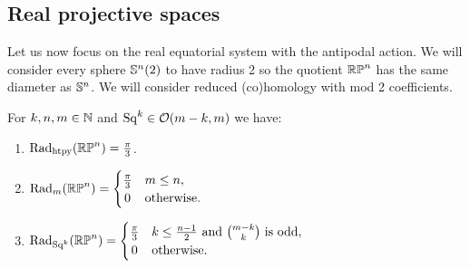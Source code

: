 
\subsection{Real projective spaces}\label{s:critical_radii_rpn}

Let us now focus on the real equatorial system with the antipodal action.
We will consider every sphere \(\mathbb{S}^n(2)\) to have radius 2 so the quotient \(\mathbb{RP}^n\) has the same diameter as \(\mathbb{S}^n\).
We will consider reduced (co)homology with mod 2 coefficients.

\medskip\lemma
For \(k,n,m \in \mathbb{N}\) and \(\mathrm{Sq}^k \in \mathcal{O}(m-k, m)\) we have:
\begin{enumerate}
	\item \(\mathrm{Rad}_{\mathrm{htpy}}(\mathbb{RP}^n) = \frac{\pi}{3}\).
	\item \(\firstdeath{m}{\rp^n} =
	\begin{cases}
		\frac{\pi}{3} & m \leq n, \\
		\hfil 0 & \text{otherwise}.
	\end{cases}\)
	\item \(\firstdeath{\Sq^k}{\rp^n} =
	\begin{cases}
		\tfrac{\pi}{3} & k \leq \frac{n-1}{2} \text{ and } \binom{m-k}{k} \text{ is odd},\\
		\hfil 0 & \text{otherwise}. \\
	\end{cases}\)
\end{enumerate}

